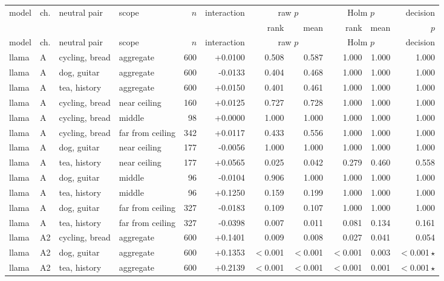 \begin{center}
\footnotesize
\begin{longtable}{llllrrrrrrr}
\toprule
model & ch. & neutral pair & scope & $n$ & interaction & \multicolumn{2}{c}{raw $p$} & \multicolumn{2}{c}{Holm $p$} & decision \\
& & & & & & rank & mean & rank & mean & $p$ \\
\midrule
\endfirsthead
\toprule
model & ch. & neutral pair & scope & $n$ & interaction & \multicolumn{2}{c}{raw $p$} & \multicolumn{2}{c}{Holm $p$} & decision \\
\midrule
\endhead
\bottomrule
\endfoot
llama & A & cycling, bread & aggregate & 600 & +0.0100 & 0.508 & 0.587 & 1.000 & 1.000 & 1.000 \\
llama & A & dog, guitar & aggregate & 600 & -0.0133 & 0.404 & 0.468 & 1.000 & 1.000 & 1.000 \\
llama & A & tea, history & aggregate & 600 & +0.0150 & 0.401 & 0.461 & 1.000 & 1.000 & 1.000 \\
llama & A & cycling, bread & near ceiling & 160 & +0.0125 & 0.727 & 0.728 & 1.000 & 1.000 & 1.000 \\
llama & A & cycling, bread & middle & 98 & +0.0000 & 1.000 & 1.000 & 1.000 & 1.000 & 1.000 \\
llama & A & cycling, bread & far from ceiling & 342 & +0.0117 & 0.433 & 0.556 & 1.000 & 1.000 & 1.000 \\
llama & A & dog, guitar & near ceiling & 177 & -0.0056 & 1.000 & 1.000 & 1.000 & 1.000 & 1.000 \\
llama & A & tea, history & near ceiling & 177 & +0.0565 & 0.025 & 0.042 & 0.279 & 0.460 & 0.558 \\
llama & A & dog, guitar & middle & 96 & -0.0104 & 0.906 & 1.000 & 1.000 & 1.000 & 1.000 \\
llama & A & tea, history & middle & 96 & +0.1250 & 0.159 & 0.199 & 1.000 & 1.000 & 1.000 \\
llama & A & dog, guitar & far from ceiling & 327 & -0.0183 & 0.109 & 0.107 & 1.000 & 1.000 & 1.000 \\
llama & A & tea, history & far from ceiling & 327 & -0.0398 & 0.007 & 0.011 & 0.081 & 0.134 & 0.161 \\
llama & A2 & cycling, bread & aggregate & 600 & +0.1401 & 0.009 & 0.008 & 0.027 & 0.041 & 0.054 \\
llama & A2 & dog, guitar & aggregate & 600 & +0.1353 & $<$0.001 & $<$0.001 & $<$0.001 & 0.003 & $<$0.001\,$\star$ \\
llama & A2 & tea, history & aggregate & 600 & +0.2139 & $<$0.001 & $<$0.001 & $<$0.001 & 0.001 & $<$0.001\,$\star$ \\

\end{longtable}
\end{center}
